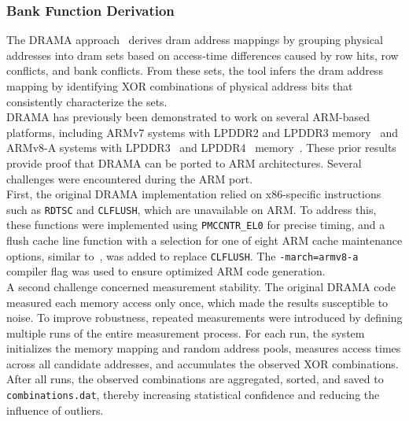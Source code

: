     \subsubsection{Bank Function Derivation} \label{subsubsec:bank-function-derivation}
        The DRAMA approach~\cite{paperDRAMA,toolDrama, thesisDRAMA} derives \gls{dram} address mappings by grouping physical addresses 
        into \gls{dram} sets based on access-time differences caused by row hits, row conflicts, and bank 
        conflicts. From these sets, the tool infers the \gls{dram} address mapping by identifying XOR combinations 
        of physical address bits that consistently characterize the sets.
        \\
        DRAMA has previously been demonstrated to work on several ARM-based platforms, including ARMv7 
        systems with LPDDR2 and LPDDR3 memory~\cite{paperDRAMA} and ARMv8-A systems with LPDDR3~\cite{docJEDECLPDDR3} and LPDDR4~\cite{docJEDECLPDDR4} memory~\cite{paperDRAMA, thesisDRAMA}. 
        These prior results provide proof that DRAMA can be ported to ARM architectures. Several challenges were 
        encountered during the ARM port. 
        \\
        First, the original DRAMA implementation
        relied on x86-specific instructions such as \texttt{RDTSC} and \texttt{CLFLUSH}, which are unavailable on ARM. To 
        address this, these functions were implemented using \texttt{PMCCNTR\_EL0} for 
        precise timing, and a flush cache line function with a selection for one of eight ARM cache maintenance options, similar 
        to~\cite{toolRowhammer-armv8}, was added to replace \texttt{CLFLUSH}. The \texttt{-march=armv8-a} compiler flag was used to ensure optimized 
        ARM code generation.
        \\
        A second challenge concerned measurement stability. The original DRAMA code measured each memory 
        access only once, which made the results susceptible to noise. To improve robustness, repeated 
        measurements were introduced by defining multiple runs of the entire measurement process. For each 
        run, the system initializes the memory mapping and random address pools, measures access times across 
        all candidate addresses, and accumulates the observed XOR combinations. After all runs, the 
        observed combinations are aggregated, sorted, and saved to \texttt{combinations.dat}, thereby increasing 
        statistical confidence and reducing the influence of outliers.
        \\
